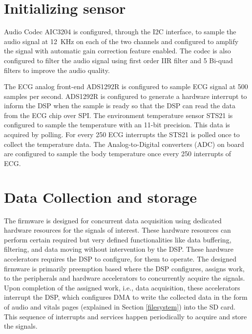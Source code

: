 \section{Initializing sensor}

Audio Codec AIC3204 is configured, through the I2C interface, to
sample the audio signal at 12~KHz on each of the two channels and
configured to amplify the signal with automatic gain correction
feature enabled. The codec is also configured to filter the audio
signal using first order IIR filter and 5 Bi-quad filters to improve
the audio quality. 

The ECG analog front-end ADS1292R is configured to sample ECG signal
at 500 samples per second. ADS1292R is configured to generate a
hardware interrupt to inform the DSP when the sample is ready so that
the DSP can read the data from the ECG chip over SPI.
The environment temperature sensor STS21 is configured to sample the
temperature with an 11-bit precision. This data is acquired by
polling.  For every 250 ECG interrupts the STS21 is polled once to
collect the temperature data.  The Analog-to-Digital converters (ADC)
on board are configured to sample the body temperature once every 250
interrupts of ECG.

\section{Data Collection and storage}

The firmware is designed for concurrent data acquisition using
dedicated hardware resources for the signals of interest. These
hardware resources can perform certain required but very defined
functionalities like data buffering, filtering, and data moving
without intervention by the DSP. These hardware accelerators requires
the DSP to configure, for them to operate. The designed firmware is
primarily preemption based where the DSP configures, assigns work, to
the peripherals and hardware accelerators to concurrently acquire the
signals. Upon completion of the assigned work, i.e., data
acquisition, these accelerators interrupt the DSP, which configures
DMA to write the collected data in the form of audio and vitals pages
(explained in Section \ref{filesystem}) into the SD card. This
sequence of interrupts and services happen periodically to acquire
and store the signals.

